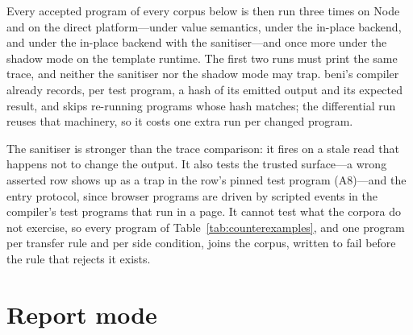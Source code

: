 Every accepted program of every corpus below is then run three times on Node and on the direct
platform---under value semantics, under the in-place backend, and under the in-place backend with the
sanitiser---and once more under the shadow mode on the template runtime. The first two runs must print the
same trace, and neither the sanitiser nor the shadow mode may trap. beni's compiler already records, per test program, a hash of
its emitted output and its expected result, and skips re-running programs whose hash matches; the
differential run reuses that machinery, so it costs one extra run per changed program.

The sanitiser is stronger than the trace comparison: it fires on a stale read that happens not to change
the output. It also tests the trusted surface---a wrong asserted row shows up as a trap in the row's
pinned test program (A8)---and the entry protocol, since browser programs are driven by scripted events in
the compiler's test programs that run in a page. It cannot test what the corpora do not exercise, so every
program of Table~\ref{tab:counterexamples}, and one program per transfer rule and per side condition, joins
the corpus, written to fail before the rule that rejects it exists.

\section{Report mode}
\label{sec:eval-report}

